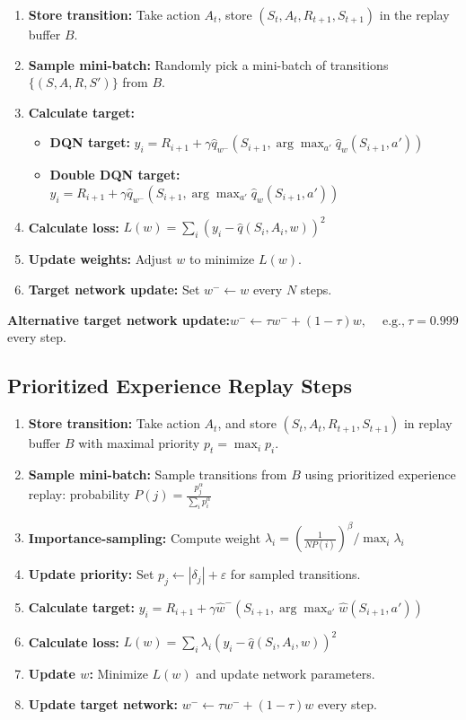 \documentclass[12pt]{article}
\begin{document}
\begin{enumerate}
    \item \textbf{Store transition:} Take action $A_t$, store $(S_t, A_t, R_{t+1}, S_{t+1})$ in the replay buffer $B$.
    \item \textbf{Sample mini-batch:} Randomly pick a mini-batch of transitions $\{(S, A, R, S')\}$ from $B$.
    \item \textbf{Calculate target:}
    \begin{itemize}
        \item \textbf{DQN target:} $y_i = R_{i+1} + \gamma \hat{q}_{w^-}(S_{i+1}, \arg\max_{a'} \hat{q}_{w}(S_{i+1}, a'))$
        \item \textbf{Double DQN target:} $y_i = R_{i+1} + \gamma \hat{q}_{w^-}(S_{i+1}, \arg\max_{a'} \hat{q}_{w}(S_{i+1}, a'))$
    \end{itemize}
    \item \textbf{Calculate loss:} $L(w) = \sum_i (y_i - \hat{q}(S_i, A_i, w))^2$
    \item \textbf{Update weights:} Adjust $w$ to minimize $L(w)$.
    \item \textbf{Target network update:} Set $w^- \leftarrow w$ every $N$ steps.
\end{enumerate}

\textbf{Alternative target network update:}\quad $w^- \leftarrow \tau w^- + (1 - \tau)w, \quad\ \text{e.g.,}\ \tau = 0.999$ every step.

\subsection{Prioritized Experience Replay Steps}

\begin{enumerate}
    \item \textbf{Store transition:} Take action $A_t$, and store $(S_t, A_t, R_{t+1}, S_{t+1})$ in replay buffer $B$ with maximal priority $p_t = \max_i p_i$.
    \item \textbf{Sample mini-batch:} Sample transitions from $B$ using prioritized experience replay: probability $P(j) = \frac{p_j^\alpha}{\sum_i p_i^\alpha}$
    \item \textbf{Importance-sampling:} Compute weight $\lambda_i = \left( \frac{1}{N P(i)} \right)^\beta / \max_i \lambda_i$
    \item \textbf{Update priority:} Set $p_j \leftarrow |\delta_j| + \varepsilon$ for sampled transitions.
    \item \textbf{Calculate target:} $y_i = R_{i+1} + \gamma \hat{w}^- (S_{i+1}, \arg\max_{a'} \hat{w}(S_{i+1}, a'))$
    \item \textbf{Calculate loss:} $L(w) = \sum_i \lambda_i (y_i - \hat{q}(S_i, A_i, w))^2$
    \item \textbf{Update $w$:} Minimize $L(w)$ and update network parameters.
    \item \textbf{Update target network:} $w^- \leftarrow \tau w^- + (1-\tau)w$ every step.
\end{enumerate}
\end{document}
